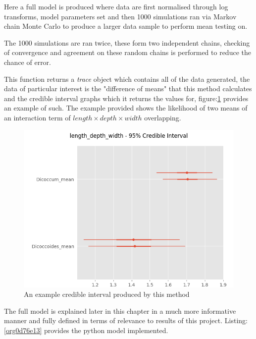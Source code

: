 \documentclass[11pt]{report}
\begin{document}
Here a full model is produced where data are first normalised through log transforms, model parameters set and then 1000 simulations ran via Markov chain Monte Carlo to produce a larger data sample to perform mean testing on.

The 1000 simulations are ran twice, these form two independent chains, checking of convergence and agreement on these random chains is performed to reduce the chance of error.

This function returns a \emph{trace} object which contains all of the data generated, the data of particular interest is the "difference of means" that this method calculates and the credible interval graphs which it returns the values for, figure:\ref{fig:org8acb184} provides an example of such. The example provided shows the likelihood of two means of an interaction term of
\(length \times  depth \times width\) overlapping.

\begin{figure}[htbp]
\centering
\includegraphics[width=15cm]{./images/ci.png}
\caption{\label{fig:org8acb184}
An example credible interval produced by this method}
\end{figure}


The full model is explained later in this chapter in a much more informative manner and fully defined in terms of relevance to results of this project. Listing:\ref{org0d76e13} provides the python model implemented.
\end{document}
